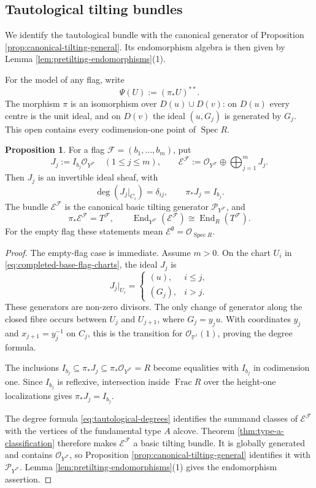 \documentclass[a4paper,reqno]{amsart}
\def\E{\mathcal{E}}
\def\F{\mathcal{F}}
\def\O{\mathcal{O}}
\def\P{\mathcal{P}}
\DeclareMathOperator{\End}{End}
\DeclareMathOperator{\Frac}{Frac}
\DeclareMathOperator{\Spec}{Spec}
\theoremstyle{definition}
\newtheorem{Prop}[Thm]{Proposition}
\begin{document}
\subsection{Tautological tilting bundles}\label{sec:tautological-tilting}

We identify the tautological bundle with the canonical generator of Proposition \ref{prop:canonical-tilting-general}. Its endomorphism algebra is then given by Lemma \ref{lem:pretilting-endomorphisms}(1).

For the model of any flag, write
\[
\Psi(U):=(\pi_*U)^{**}.
\]
The morphism $\pi$ is an isomorphism over $D(u)\cup D(v)$: on $D(u)$ every centre is the unit ideal, and on $D(v)$ the ideal $(u,G_j)$ is generated by $G_j$. This open contains every codimension-one point of $\Spec R$.

\begin{Prop}\label{prop:tautological-tilting}
For a flag $\F=(b_1,\ldots,b_m)$, put
\[
J_j:=I_{b_j}\O_{Y^\F}\quad(1\le j\le m),\qquad
\E^\F:=\O_{Y^\F}\oplus\bigoplus_{j=1}^mJ_j.
\]
Then $J_j$ is an invertible ideal sheaf, with
\begin{equation}\label{eq:tautological-degrees}
\deg(J_j|_{C_i})=\delta_{ij},\qquad \pi_*J_j=I_{b_j}.
\end{equation}
The bundle $\E^\F$ is the canonical basic tilting generator $\P_{Y^\F}$, and
\begin{equation}\label{eq:tautological-endomorphisms}
\pi_*\E^\F=T^\F,\qquad
\End_{Y^\F}(\E^\F)\cong\End_R(T^\F).
\end{equation}
For the empty flag these statements mean $\E^\emptyset=\O_{\Spec R}$.
\end{Prop}
\begin{proof}
The empty-flag case is immediate. Assume $m>0$. On the chart $U_i$ in \eqref{eq:completed-base-flag-charts}, the ideal $J_j$ is
\[
J_j|_{U_i}=\begin{cases}(u),&i\le j,\\(G_j),&i>j.\end{cases}
\]
These generators are non-zero divisors. The only change of generator along the closed fibre occurs between $U_j$ and $U_{j+1}$, where $G_j=y_ju$. With coordinates $y_j$ and $x_{j+1}=y_j^{-1}$ on $C_j$, this is the transition for $\O_{\mathbb P^1}(1)$, proving the degree formula.

The inclusions $I_{b_j}\subseteq\pi_*J_j\subseteq\pi_*\O_{Y^\F}=R$ become equalities with $I_{b_j}$ in codimension one. Since $I_{b_j}$ is reflexive, intersection inside $\Frac R$ over the height-one localizations gives $\pi_*J_j=I_{b_j}$.

The degree formula \eqref{eq:tautological-degrees} identifies the summand classes of $\E^\F$ with the vertices of the fundamental type $A$ alcove. Theorem \ref{thm:type-a-classification} therefore makes $\E^\F$ a basic tilting bundle. It is globally generated and contains $\O_{Y^\F}$, so Proposition \ref{prop:canonical-tilting-general} identifies it with $\P_{Y^\F}$. Lemma \ref{lem:pretilting-endomorphisms}(1) gives the endomorphism assertion.
\end{proof}
\end{document}
